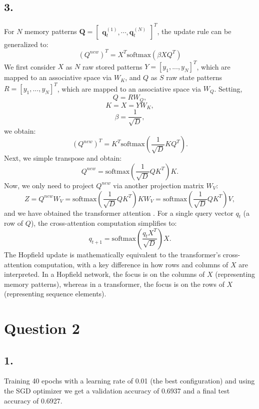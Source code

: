 \documentclass[a4paper, 12pt]{article}
\begin{document}
\subsection*{3.}
For $N$ memory patterns $\mathbf{Q} = \begin{bmatrix} \mathbf{q}_t^{(1)},  \cdots, \mathbf{q}_t^{(N)} \end{bmatrix}^T$, the update rule can be generalized to:
\[
(Q^{new})^T = X^T \text{softmax}(\beta X Q^T)
\]
We first consider $X$ as $N$ raw stored patterns $Y = [y_1,..., y_N]^T$, which are mapped to an associative space via $W_K$, and $Q$ as $S$ raw state patterns $R = [y_1,..., y_N]^T$, which are mapped to an associative space via $W_Q$. Setting, 
\[
Q=RW_Q,
\]
\[
K=X=YW_K, 
\]
\[
\beta= \frac{1}{\sqrt{D}},
\]
we obtain:
\[
(Q^{new})^T = K^T \text{softmax}\left(\frac{1}{\sqrt{D}} K Q^T \right).
\]
Next, we simple transpose and obtain:
\[
Q^{new} = \text{softmax}\left(\frac{1}{\sqrt{D}} Q K^T\right)K.
\]
Now, we only need to project $Q^{new}$ via another projection matrix $W_V$:
\[
Z= Q^{new}W_V = \text{softmax}\left(\frac{1}{\sqrt{D}} Q K^T\right)KW_V = \text{softmax}\left(\frac{1}{\sqrt{D}} Q K^T\right) V,
\]
and we have obtained the transformer attention \cite{brandstetter2020hopfield}. For a single query vector $q_t$ (a row of $Q$), the cross-attention computation simplifies to:
\[
q_{t+1}= \text{softmax} \left( \frac{q_t X^T}{\sqrt{D}} \right) X.
\]
The Hopfield update is mathematically equivalent to the transformer's cross-attention computation, with a key difference in how rows and columns of $X$ are interpreted. In a Hopfield network, the focus is on the columns of $X$ (representing memory patterns), whereas in a transformer, the focus is on the rows of $X$ (representing sequence elements).
\section*{Question 2}
\subsection*{1.}
Training 40 epochs with a learning rate of 0.01 (the best configuration) and using the SGD optimizer we get a validation accuracy of 0.6937 and a final test accuracy of 0.6927.
\end{document}
